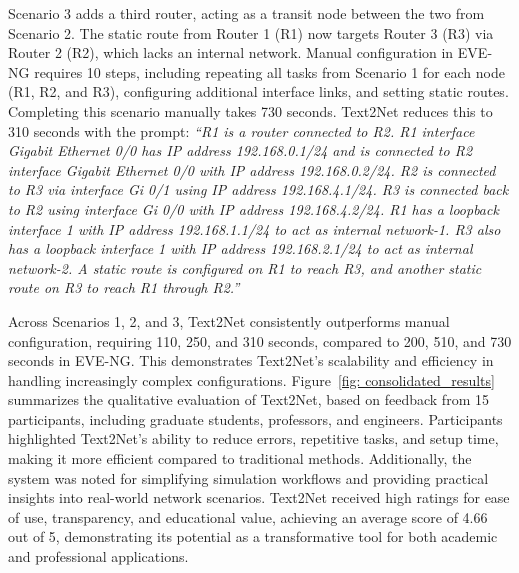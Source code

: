 Scenario 3 adds a third router, acting as a transit node between the two from Scenario 2. The static route from Router 1 (R1) now targets Router 3 (R3) via Router 2 (R2), which lacks an internal network. Manual configuration in EVE-NG requires 10 steps, including repeating all tasks from Scenario 1 for each node (R1, R2, and R3), configuring additional interface links, and setting static routes. Completing this scenario manually takes 730 seconds.
Text2Net reduces this to 310 seconds with the prompt:
\textit{“R1 is a router connected to R2. R1 interface Gigabit Ethernet 0/0 has IP address 192.168.0.1/24 and is connected to R2 interface Gigabit Ethernet 0/0 with IP address 192.168.0.2/24. R2 is connected to R3 via interface Gi 0/1 using IP address 192.168.4.1/24. R3 is connected back to R2 using interface Gi 0/0 with IP address 192.168.4.2/24. R1 has a loopback interface 1 with IP address 192.168.1.1/24 to act as internal network-1. R3 also has a loopback interface 1 with IP address 192.168.2.1/24 to act as internal network-2. A static route is configured on R1 to reach R3, and another static route on R3 to reach R1 through R2.”}

Across Scenarios 1, 2, and 3, Text2Net consistently outperforms manual configuration, requiring 110, 250, and 310 seconds, compared to 200, 510, and 730 seconds in EVE-NG. This demonstrates Text2Net’s scalability and efficiency in handling increasingly complex configurations.
Figure~\ref{fig: consolidated_results} summarizes the qualitative evaluation of Text2Net, based on feedback from 15 participants, including graduate students, professors, and engineers. Participants highlighted Text2Net’s ability to reduce errors, repetitive tasks, and setup time, making it more efficient compared to traditional methods. Additionally, the system was noted for simplifying simulation workflows and providing practical insights into real-world network scenarios. Text2Net received high ratings for ease of use, transparency, and educational value, achieving an average score of 4.66 out of 5, demonstrating its potential as a transformative tool for both academic and professional applications.









